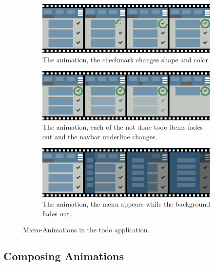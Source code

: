 \begin{figure}[!htbp]
\centering

\begin{subfigure}[h]{\textwidth}
\centering
\includegraphics[width=\figscale\textwidth]{pictures/completeIconCheckFig}
\caption{The  animation, the checkmark changes shape and color.}
\label{fig:completeIconCheck}
\end{subfigure}

\begin{subfigure}[h]{\textwidth}
\centering
\includegraphics[width=\figscale\textwidth]{pictures/onlyDoneFig}
\caption{The  animation, each of the not done todo items fades out and the navbar underline changes.}
\label{fig:onlyDoneFig}
\end{subfigure}

\begin{subfigure}[h]{\textwidth}
\centering
\includegraphics[width=\figscale\textwidth]{pictures/menuIntroFig}
\caption{The  animation, the menu appears while the background fades out.}
\label{fig:menuIntroFig}
\end{subfigure}

\caption{Micro-Animations in the todo application.}
\label{fig:animExamples}
\end{figure}

\subsection{Composing Animations}

